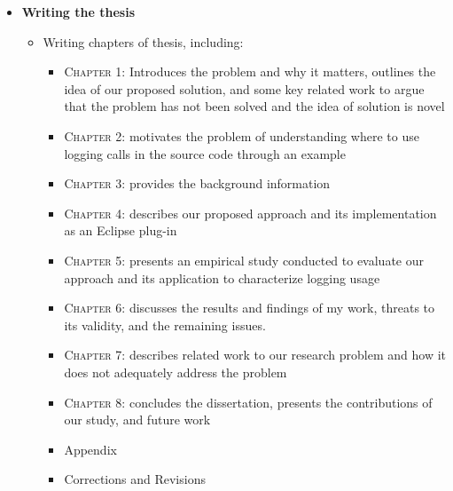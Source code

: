 \documentclass{article}
\newcommand{\cmark}{\ding{51}}%
\newcommand{\pmark}{\ding{59}}%
\newcommand{\bld}{\textbf}
\newcommand{\tsc}{\textsc}
\begin{document}
\begin{itemize} [leftmargin=.1in]
\item \bld{Writing the thesis} \pmark {}
\begin{itemize}
\item Writing chapters of thesis, including:
\begin{itemize}
\item \tsc{Chapter 1:} Introduces the problem and why it matters, outlines the idea of our proposed solution, and some key related work to argue that the problem has not been solved and the idea of solution is novel \pmark {}
\item \tsc{Chapter 2:} motivates the problem of understanding where to use logging calls in the source code through an example \pmark {}
\item \tsc{Chapter 3:} provides the background information  \cmark 
\item \tsc{Chapter 4:} describes our proposed approach and its implementation as an Eclipse plug-in \cmark 
\item \tsc{Chapter 5:} presents an empirical study conducted to evaluate our approach and its application to characterize logging usage \pmark {}
\item \tsc{Chapter 6:} discusses the results and findings of my work, threats to its validity, and the remaining issues. \pmark {}
\item \tsc{Chapter 7:} describes related work to our research problem and how it does not adequately address the problem \cmark 
\item \tsc{Chapter 8:} concludes the dissertation, presents the contributions of our study, and future work \pmark {}
\item Appendix \pmark {}
\item Corrections and Revisions \pmark {}
\end{itemize}
\end{itemize}

\end{itemize} %
\end{document}

